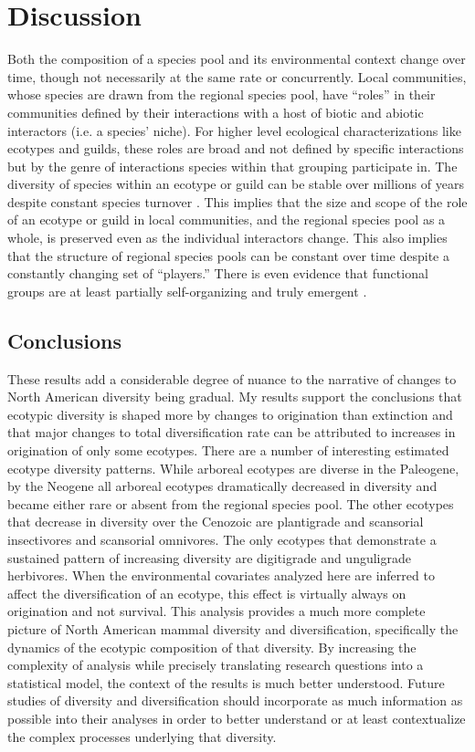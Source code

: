\documentclass[12pt,letterpaper]{article}
\begin{document}
\section*{Discussion}

Both the composition of a species pool and its environmental context change over time, though not necessarily at the same rate or concurrently. Local communities, whose species are drawn from the regional species pool, have ``roles'' in their communities defined by their interactions with a host of biotic and abiotic interactors (i.e. a species' niche). For higher level ecological characterizations like ecotypes and guilds, these roles are broad and not defined by specific interactions but by the genre of interactions species within that grouping participate in. The diversity of species within an ecotype or guild can be stable over millions of years despite constant species turnover \citep{Jernvall2004,Slater2015c,Valkenburgh1999}. This implies that the size and scope of the role of an ecotype or guild in local communities, and the regional species pool as a whole, is preserved even as the individual interactors change. This also implies that the structure of regional species pools can be constant over time despite a constantly changing set of ``players.'' There is even evidence that functional groups are at least partially self-organizing and truly emergent \citep{Scheffer2006a}.



\subsection*{Conclusions}

These results add a considerable degree of nuance to the narrative of changes to North American diversity being gradual. My results support the conclusions that ecotypic diversity is shaped more by changes to origination than extinction and that major changes to total diversification rate can be attributed to increases in origination of only some ecotypes. There are a number of interesting estimated ecotype diversity patterns. While arboreal ecotypes are diverse in the Paleogene, by the Neogene all arboreal ecotypes dramatically decreased in diversity and became either rare or absent from the regional species pool. The other ecotypes that decrease in diversity over the Cenozoic are plantigrade and scansorial insectivores and scansorial omnivores. The only ecotypes that demonstrate a sustained pattern of increasing diversity are digitigrade and unguligrade herbivores. When the environmental covariates analyzed here are inferred to affect the diversification of an ecotype, this effect is virtually always on origination and not survival. This analysis provides a much more complete picture of North American mammal diversity and diversification, specifically the dynamics of the ecotypic composition of that diversity. By increasing the complexity of analysis while precisely translating research questions into a statistical model, the context of the results is much better understood. Future studies of diversity and diversification should incorporate as much information as possible into their analyses in order to better understand or at least contextualize the complex processes underlying that diversity.
\end{document}
